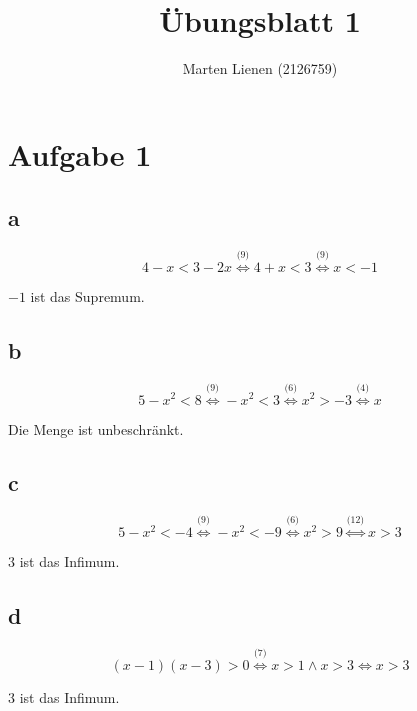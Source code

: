 \documentclass[a4paper,10pt]{article}
\title{Übungsblatt 1}
\author{Marten Lienen (2126759)}
\begin{document}
\newcommand{\eqstep}[1]{\overset{\text{(#1)}}{\Longleftrightarrow}}

\newtheorem*{claim}{Behauptung}

\maketitle

\section*{Aufgabe 1}

\subsection*{a}

\begin{equation}
 4 - x < 3 - 2x \eqstep{9} 4 + x < 3 \eqstep{9} x < -1
\end{equation}

$-1$ ist das Supremum.

\subsection*{b}

\begin{equation}
 5 - x^2 < 8 \eqstep{9} -x^2 < 3 \eqstep{6} x^2 > -3 \eqstep{4} x
\end{equation}

Die Menge ist unbeschränkt.

\subsection*{c}

\begin{equation}
 5 - x^2 < -4 \eqstep{9} -x^2 < -9 \eqstep{6} x^2 > 9 \eqstep{12} x > 3
\end{equation}

$3$ ist das Infimum.

\subsection*{d}

\begin{equation}
 (x - 1)(x - 3) > 0 \eqstep{7} x > 1 \land x > 3 \Leftrightarrow x > 3
\end{equation}

$3$ ist das Infimum.
\end{document}
